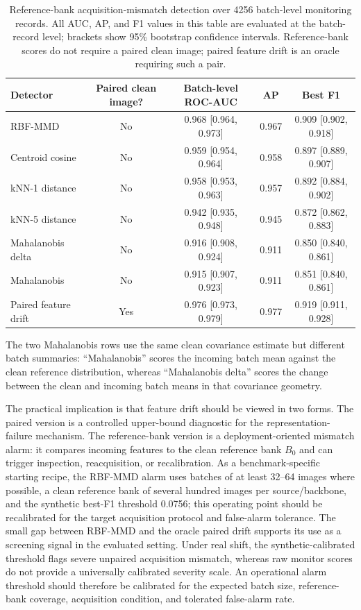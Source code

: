 \documentclass[a4paper,fleqn]{els-cas-templates/cas-sc}
\begin{document}
\begin{table}[pos=htbp]
\centering
\caption{Reference-bank acquisition-mismatch detection over 4256 batch-level
monitoring records. All AUC, AP, and F1 values in this table are evaluated at
the batch-record level; brackets show 95\% bootstrap confidence intervals.
Reference-bank scores do not
require a paired clean image; paired feature drift is an oracle requiring such a
pair.}
\label{tab:monitor}
\small
\begin{tabular}{lcccc}
\toprule
Detector & Paired clean image? & Batch-level ROC-AUC & AP & Best F1 \\
\midrule
RBF-MMD & No & 0.968 [0.964, 0.973] & 0.967 & 0.909 [0.902, 0.918] \\
Centroid cosine & No & 0.959 [0.954, 0.964] & 0.958 & 0.897 [0.889, 0.907] \\
kNN-1 distance & No & 0.958 [0.953, 0.963] & 0.957 & 0.892 [0.884, 0.902] \\
kNN-5 distance & No & 0.942 [0.935, 0.948] & 0.945 & 0.872 [0.862, 0.883] \\
Mahalanobis delta & No & 0.916 [0.908, 0.924] & 0.911 & 0.850 [0.840, 0.861] \\
Mahalanobis & No & 0.915 [0.907, 0.923] & 0.911 & 0.851 [0.840, 0.861] \\
Paired feature drift & Yes & 0.976 [0.973, 0.979] & 0.977 & 0.919 [0.911, 0.928] \\
\bottomrule
\end{tabular}
\end{table}

The two Mahalanobis rows use the same clean covariance estimate but different
batch summaries: ``Mahalanobis'' scores the incoming batch mean against the clean
reference distribution, whereas ``Mahalanobis delta'' scores the change between
the clean and incoming batch means in that covariance geometry.

The practical implication is that feature drift should be viewed in two forms.
The paired version is a controlled upper-bound diagnostic for the
representation-failure mechanism. The reference-bank version is a
deployment-oriented mismatch alarm: it compares incoming features to the clean
reference bank $B_0$ and can trigger inspection, reacquisition, or recalibration.
As a benchmark-specific starting recipe, the RBF-MMD alarm uses batches of at least
32--64 images where possible, a clean reference bank of several hundred images
per source/backbone, and the synthetic best-F1 threshold 0.0756; this operating
point should be recalibrated for the target acquisition protocol and
false-alarm tolerance. The small gap between RBF-MMD and the oracle paired drift
supports its use as a screening signal in the evaluated setting. Under real
shift, the synthetic-calibrated threshold flags severe unpaired acquisition
mismatch, whereas raw monitor scores do not provide a universally calibrated
severity scale. An operational alarm
threshold should therefore be calibrated for the expected batch size,
reference-bank coverage, acquisition condition, and tolerated false-alarm rate.
\end{document}
